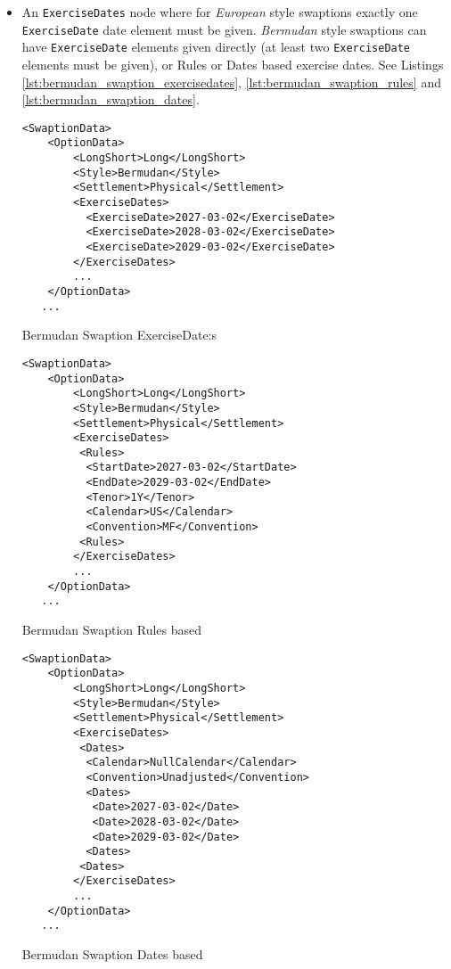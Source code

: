 \begin{itemize}
\item An \lstinline!ExerciseDates! node where for \emph{European} style swaptions exactly one \lstinline!ExerciseDate! date element must be given.  \emph{Bermudan} style swaptions can have \lstinline!ExerciseDate! elements given directly (at least two  \lstinline!ExerciseDate! elements must be given), or Rules or Dates based exercise dates. See Listings \ref{lst:bermudan_swaption_exercisedates}, \ref{lst:bermudan_swaption_rules} and \ref{lst:bermudan_swaption_dates}.


\begin{listing}[H]
\begin{verbatim}
<SwaptionData>
    <OptionData>
        <LongShort>Long</LongShort>
        <Style>Bermudan</Style>
        <Settlement>Physical</Settlement>
        <ExerciseDates>
          <ExerciseDate>2027-03-02</ExerciseDate>
          <ExerciseDate>2028-03-02</ExerciseDate>
          <ExerciseDate>2029-03-02</ExerciseDate>
        </ExerciseDates>
        ...
    </OptionData>
   ...
\end{verbatim}
\caption{Bermudan Swaption ExerciseDate:s}
\label{lst:bermudan_swaption_exercisedates}
\end{listing}

\begin{listing}[H]
\begin{verbatim}
<SwaptionData>
    <OptionData>
        <LongShort>Long</LongShort>
        <Style>Bermudan</Style>
        <Settlement>Physical</Settlement>
        <ExerciseDates>
         <Rules>
          <StartDate>2027-03-02</StartDate>
          <EndDate>2029-03-02</EndDate>
          <Tenor>1Y</Tenor>
          <Calendar>US</Calendar>
          <Convention>MF</Convention>
         <Rules>                    
        </ExerciseDates>
        ...
    </OptionData>
   ...
\end{verbatim}
\caption{Bermudan Swaption Rules based}
\label{lst:bermudan_swaption_rules}
\end{listing}

\begin{listing}[H]
\begin{verbatim}
<SwaptionData>
    <OptionData>
        <LongShort>Long</LongShort>
        <Style>Bermudan</Style>
        <Settlement>Physical</Settlement>
        <ExerciseDates>
         <Dates>
          <Calendar>NullCalendar</Calendar>
          <Convention>Unadjusted</Convention>
          <Dates>
           <Date>2027-03-02</Date>
           <Date>2028-03-02</Date>
           <Date>2029-03-02</Date>
          <Dates>
         <Dates>                    
        </ExerciseDates>
        ...
    </OptionData>
   ...
\end{verbatim}
\caption{Bermudan Swaption Dates based}
\label{lst:bermudan_swaption_dates}
\end{listing}



\end{itemize}
